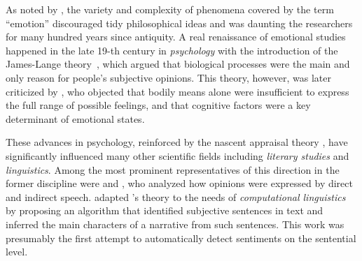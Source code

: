 As noted by \citet{Sousa:14}, the variety and complexity of phenomena
covered by the term ``emotion'' discouraged tidy philosophical ideas
and was daunting the researchers for many hundred years since
antiquity.  A real renaissance of emotional studies happened in the
late 19-th century in \emph{psychology} with the introduction of the
James-Lange theory~\cite{James:1884,Lange:1885}, which argued that
biological processes were the main and only reason for people's
subjective opinions.  This theory, however, was later criticized by
\citet{Schachter:62}, who objected that bodily means alone were
insufficient to express the full range of possible feelings, and that
cognitive factors were a key determinant of emotional states.


These advances in psychology, reinforced by the nascent appraisal
theory \citep{Arnold:60}, have significantly influenced many other
scientific fields including \emph{literary studies} and
\emph{linguistics}.  Among the most prominent representatives of this
direction in the former discipline were \citet{Rorty:80} and
\citet{Banfield:82}, who analyzed how opinions were expressed by
direct and indirect speech.  \citet{Wiebe:90a,Wiebe:94} adapted
\citeauthor{Banfield:82}'s theory to the needs of \emph{computational
  linguistics} by proposing an algorithm that identified subjective
sentences in text and inferred the main characters of a narrative from
such sentences.  This work was presumably the first attempt to
automatically detect sentiments on the sentential level.

